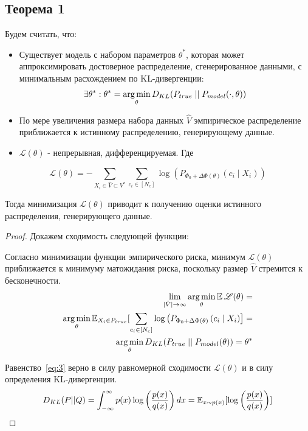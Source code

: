 \subsection{Теорема 1~\cite{lee2023mathematical}}
\begin{theorem}
Будем считать, что: 
\begin{itemize}
    \item Существует модель с набором параметров $\theta^*$, которая может аппроксимировать достоверное распределение, сгенерированное данными, с минимальным расхождением по KL-дивергенции: 
    \begin{equation}
    \label{eq:1}
    \exists \theta^*: \theta^* = \operatorname*{arg\,min} _\theta D_{KL}(P_{true} \mid\mid P_{model}(\cdot, \theta))
    \end{equation}
     \item По мере увеличения размера набора данных $\hat{V}$ эмпирическое распределение приближается к истинному распределению, генерирующему данные.
     \item $\mathscr{L}(\theta)$ - непрерывная, дифференцируемая. Где
\end{itemize} 
\begin{equation}
\label{eq:2}
\mathscr{L}(\theta) = -\sum_{X_i \in \hat{V} \subset V^{*}} \sum_{c_i \in [N_c]} \log \left(P_{\Phi_0+\Delta \Phi(\theta)}\left(c_i \mid X_i\right)\right)
\end{equation}

Тогда минимизация $\mathscr{L}(\theta)$ приводит к получению оценки истинного распределения, генерирующего данные.

\end{theorem}
\renewcommand\qedsymbol{$\blacksquare$}
\begin{proof}
Докажем сходимость следующей функции:

Согласно минимизации функции эмпирического риска, минимум $\mathscr{L}(\theta)$ приближается к минимуму матожидания риска, поскольку размер $\hat{V}$ стремится к бесконечности.
\begin{equation}
\label{eq:3}
\begin{aligned}
\lim_{\mid\hat{V}\mid\to\infty} \operatorname*{arg\,min} _\theta \operatorname{\mathbb{E}} \mathscr{L}(\theta) =\\
\operatorname*{arg\,min} _\theta \operatorname{\mathbb{E}} _{X_i\in P_{true}}[\sum_{c_i \in [N_c]} \log \left(P_{\Phi_0+\Delta \Phi(\theta)}\left(c_i \mid X_i\right)\right] =\\
\operatorname*{arg\,min} _\theta D_{KL}(P_{true}\mid\mid P_{model}(\theta)) = \theta^*
\end{aligned}
\end{equation}

Равенство~\eqref{eq:3} верно в силу равномерной сходимости $\mathscr{L}(\theta)$ и в силу определения KL-дивергенции.
\begin{equation}
\label{eq:4}
D_{KL}(P || Q)=\int_{-\infty}^{\infty} p(x) \log \left(\frac{p(x)}{q(x)}\right) dx = \operatorname{\mathbb{E}} _{x \sim p(x)}[\log \left(\frac{p(x)}{q(x)}\right)]
\end{equation}
\end{proof}

